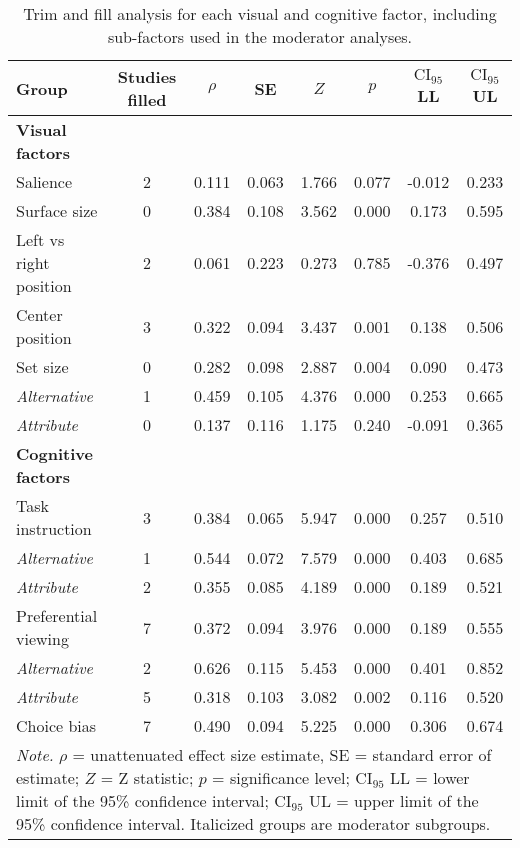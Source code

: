 \begin{table}[ht]
\centering
\caption{Trim and fill analysis for each visual and cognitive factor, including sub-factors used in the moderator analyses.} 
\label{tab:trim_fill_results}
\begin{tabular}{lccccccc}
  \hline
Group & Studies filled & $\rho$ & SE & $Z$ & $p$ & $\textrm{CI}_{95}$ LL & $\textrm{CI}_{95}$ UL \\ 
  \hline
\textbf{Visual factors} &  &  &  &  &  &  &  \\ 
  Salience & 2 & 0.111 & 0.063 & 1.766 & 0.077 & -0.012 & 0.233 \\ 
  Surface size & 0 & 0.384 & 0.108 & 3.562 & 0.000 & 0.173 & 0.595 \\ 
  Left vs right position & 2 & 0.061 & 0.223 & 0.273 & 0.785 & -0.376 & 0.497 \\ 
  Center position & 3 & 0.322 & 0.094 & 3.437 & 0.001 & 0.138 & 0.506 \\ 
  Set size & 0 & 0.282 & 0.098 & 2.887 & 0.004 & 0.090 & 0.473 \\ 
  \hspace{2mm}\textit{Alternative} & 1 & 0.459 & 0.105 & 4.376 & 0.000 & 0.253 & 0.665 \\ 
  \hspace{2mm}\textit{Attribute} & 0 & 0.137 & 0.116 & 1.175 & 0.240 & -0.091 & 0.365 \\ 
  \textbf{Cognitive factors} &  &  &  &  &  &  &  \\ 
  Task instruction & 3 & 0.384 & 0.065 & 5.947 & 0.000 & 0.257 & 0.510 \\ 
  \hspace{2mm}\textit{Alternative} & 1 & 0.544 & 0.072 & 7.579 & 0.000 & 0.403 & 0.685 \\ 
  \hspace{2mm}\textit{Attribute} & 2 & 0.355 & 0.085 & 4.189 & 0.000 & 0.189 & 0.521 \\ 
  Preferential viewing & 7 & 0.372 & 0.094 & 3.976 & 0.000 & 0.189 & 0.555 \\ 
  \hspace{2mm}\textit{Alternative} & 2 & 0.626 & 0.115 & 5.453 & 0.000 & 0.401 & 0.852 \\ 
  \hspace{2mm}\textit{Attribute} & 5 & 0.318 & 0.103 & 3.082 & 0.002 & 0.116 & 0.520 \\ 
  Choice bias & 7 & 0.490 & 0.094 & 5.225 & 0.000 & 0.306 & 0.674 \\ 
   \hline 
 \multicolumn{8}{p{0.9\textwidth}}{\scriptsize{\textit{Note.} $\rho$ = unattenuated effect size estimate, SE = standard error of estimate; $Z$ = Z statistic; $p$ = significance level; $\textrm{CI}_{95}$ LL = lower limit of the 95\% confidence interval; $\textrm{CI}_{95}$ UL = upper limit of the 95\% confidence interval. Italicized groups are moderator subgroups.}} 
\end{tabular}
\end{table}
